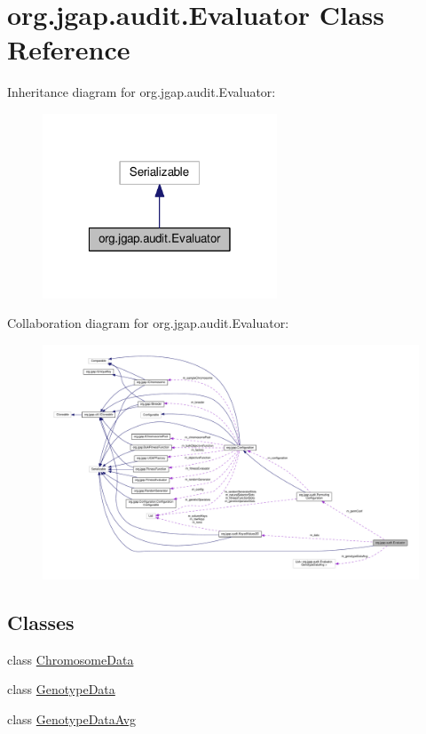 \hypertarget{classorg_1_1jgap_1_1audit_1_1_evaluator}{\section{org.\-jgap.\-audit.\-Evaluator Class Reference}
\label{classorg_1_1jgap_1_1audit_1_1_evaluator}
}


Inheritance diagram for org.\-jgap.\-audit.\-Evaluator\-:
\nopagebreak
\begin{figure}[H]
\begin{center}
\leavevmode
\includegraphics[width=198pt]{classorg_1_1jgap_1_1audit_1_1_evaluator__inherit__graph}
\end{center}
\end{figure}


Collaboration diagram for org.\-jgap.\-audit.\-Evaluator\-:
\nopagebreak
\begin{figure}[H]
\begin{center}
\leavevmode
\includegraphics[width=350pt]{classorg_1_1jgap_1_1audit_1_1_evaluator__coll__graph}
\end{center}
\end{figure}
\subsection*{Classes}
\begin{DoxyCompactItemize}
\item 
class \hyperlink{classorg_1_1jgap_1_1audit_1_1_evaluator_1_1_chromosome_data}{Chromosome\-Data}
\item 
class \hyperlink{classorg_1_1jgap_1_1audit_1_1_evaluator_1_1_genotype_data}{Genotype\-Data}
\item 
class \hyperlink{classorg_1_1jgap_1_1audit_1_1_evaluator_1_1_genotype_data_avg}{Genotype\-Data\-Avg}
\end{DoxyCompactItemize}
